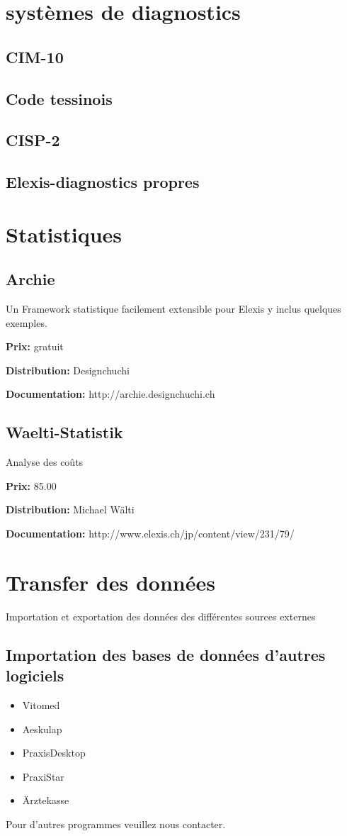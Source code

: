 \documentclass[paper=a4,BCOR8.25mm]{scrartcl}
\begin{document}
\section{systèmes de diagnostics}
\subsection{CIM-10}
\subsection{Code tessinois}
\subsection{CISP-2}
\subsection{Elexis-diagnostics propres}

\section{Statistiques}
\subsection{Archie}
Un Framework statistique facilement extensible pour Elexis y inclus quelques exemples.

\textbf{Prix:} gratuit

\textbf{Distribution:} Designchuchi

\textbf{Documentation:} http://archie.designchuchi.ch

\subsection{Waelti-Statistik}
Analyse des coûts

\textbf{Prix:} 85.00

\textbf{Distribution:} Michael Wälti

\textbf{Documentation:} http://www.elexis.ch/jp/content/view/231/79/


\section{Transfer des données}
Importation et exportation des données des différentes sources externes

\subsection{Importation des bases de données d'autres logiciels }
\begin{itemize}
\item Vitomed
\item Aeskulap
\item PraxisDesktop
\item PraxiStar
\item Ärztekasse
\end{itemize}
 Pour d'autres programmes veuillez nous contacter.
\end{document}
